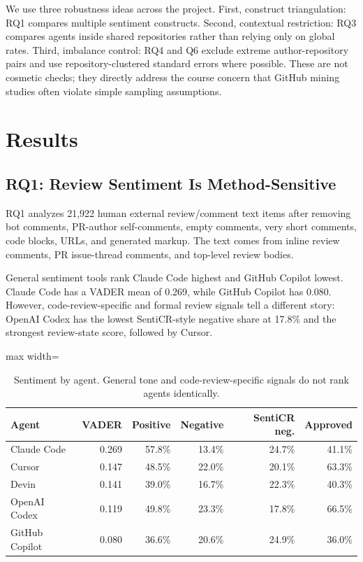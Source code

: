 \documentclass[sigconf,nonacm]{acmart}
\begin{document}
We use three robustness ideas across the project. First, construct triangulation: RQ1 compares multiple sentiment constructs. Second, contextual restriction: RQ3 compares agents inside shared repositories rather than relying only on global rates. Third, imbalance control: RQ4 and Q6 exclude extreme author-repository pairs and use repository-clustered standard errors where possible. These are not cosmetic checks; they directly address the course concern that GitHub mining studies often violate simple sampling assumptions.

\FloatBarrier
\section{Results}

\subsection{RQ1: Review Sentiment Is Method-Sensitive}

RQ1 analyzes 21,922 human external review/comment text items after removing bot comments, PR-author self-comments, empty comments, very short comments, code blocks, URLs, and generated markup. The text comes from inline review comments, PR issue-thread comments, and top-level review bodies.

General sentiment tools rank Claude Code highest and GitHub Copilot lowest. Claude Code has a VADER mean of 0.269, while GitHub Copilot has 0.080. However, code-review-specific and formal review signals tell a different story: OpenAI Codex has the lowest SentiCR-style negative share at 17.8\% and the strongest review-state score, followed by Cursor.

\begin{table}[!htbp]
\caption{Sentiment by agent. General tone and code-review-specific signals do not rank agents identically.}
\label{tab:sentiment}
\centering
\scriptsize
\begin{adjustbox}{max width=\linewidth}
\begin{tabular}{lrrrrr}
\toprule
Agent & VADER & Positive & Negative & SentiCR neg. & Approved \\
\midrule
Claude Code & 0.269 & 57.8\% & 13.4\% & 24.7\% & 41.1\% \\
Cursor & 0.147 & 48.5\% & 22.0\% & 20.1\% & 63.3\% \\
Devin & 0.141 & 39.0\% & 16.7\% & 22.3\% & 40.3\% \\
OpenAI Codex & 0.119 & 49.8\% & 23.3\% & 17.8\% & 66.5\% \\
GitHub Copilot & 0.080 & 36.6\% & 20.6\% & 24.9\% & 36.0\% \\
\bottomrule
\end{tabular}
\end{adjustbox}
\end{table}
\end{document}
